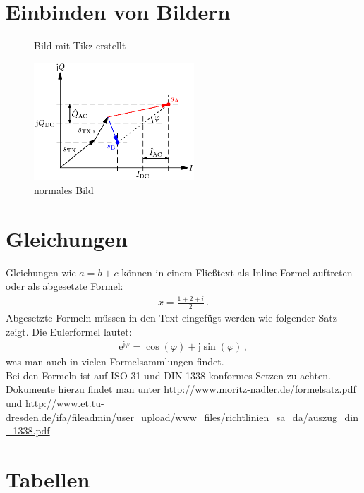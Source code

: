 \section{Einbinden von Bildern}
\label{sec:bilder}

\begin{figure}[!htb]\centering

\caption{Bild mit Tikz erstellt}
\label{fig:bild_tikz}
\end{figure}


\begin{figure}[!htb]\centering
\includegraphics*[width = 6cm]{bilder/grundlagen/RX_Basisbandsignal_IQ_Diagramm}
\caption{normales Bild}
\label{fig:normales_bild}
\end{figure}



\section{Gleichungen}
\label{sec:gleichungen}
Gleichungen wie $a=b+c$ können in einem Fließtext als Inline-Formel auftreten oder als abgesetzte Formel:
\begin{align}
	x = \frac{1+2+i}{2} \, .
	\label{eq:gleichung1}
\end{align}
Abgesetzte Formeln müssen in den Text eingefügt werden wie folgender Satz zeigt. Die Eulerformel lautet:
\begin{align}
	\mathrm{e}^{\mathrm{j}\varphi} = \cos(\varphi) + \mathrm{j} \sin(\varphi) \, ,
	\label{eq:gleichung2}
\end{align}
was man auch in vielen Formelsammlungen findet. \\
Bei den Formeln ist auf ISO-31 und DIN 1338 konformes Setzen zu achten. Dokumente hierzu findet man unter \url{http://www.moritz-nadler.de/formelsatz.pdf} und \url{http://www.et.tu-dresden.de/ifa/fileadmin/user_upload/www_files/richtlinien_sa_da/auszug_din_1338.pdf}

\newpage
\section{Tabellen}

